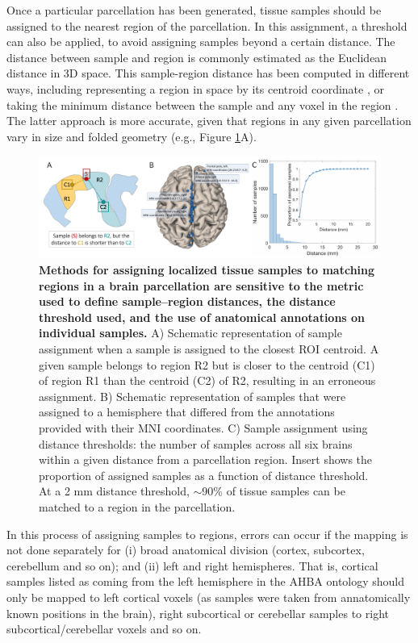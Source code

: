\documentclass[10pt,A4]{article}
\begin{document}
Once a particular parcellation has been generated, tissue samples should be assigned to the nearest region of the parcellation. In this assignment, a threshold can also be applied, to avoid assigning samples beyond a certain distance. The distance between sample and region is commonly estimated as the Euclidean distance in 3D space. This sample-region distance has been computed in different ways, including representing a region in space by its centroid coordinate \citep{Vertes2016b,Whitaker2016a,McColgan2018}, or taking the minimum distance between the sample and any voxel in the region \citep{French2015,Parkes2017,Romme2017}. The latter approach is more accurate, given that regions in any given parcellation vary in size and folded geometry (e.g., Figure \ref{fig:Ch4Fig5}A).

\begin{figure}[h!]
  \centering
    \includegraphics[width=1\textwidth]{Ch4Fig5.pdf}
\caption{\textbf{Methods for assigning localized tissue samples to matching regions in a brain parcellation are sensitive to the metric used to define sample–region distances, the distance threshold used, and the use of anatomical annotations on individual samples.}
A) Schematic representation of sample assignment when a sample is assigned to the closest ROI centroid. A given sample belongs to region R2 but is closer to the centroid (C1) of region R1 than the centroid (C2) of R2, resulting in an erroneous assignment.
B) Schematic representation of samples that were assigned to a hemisphere that differed from the annotations provided with their MNI coordinates.
C) Sample assignment using distance thresholds: the number of samples across all six brains within a given distance from a parcellation region. Insert shows the proportion of assigned samples as a function of distance threshold. At a \num{2} mm distance threshold, $\sim$\num{90}\%  of tissue samples can be matched to a region in the parcellation. }
\label{fig:Ch4Fig5}
\end{figure}

In this process of assigning samples to regions, errors can occur if the mapping is not done separately for (i) broad anatomical division (cortex, subcortex, cerebellum and so on); and (ii) left and right hemispheres. That is, cortical samples listed as coming from the left hemisphere in the AHBA ontology should only be mapped to left cortical voxels (as samples were taken from annatomically known positions in the brain), right subcortical or cerebellar samples to right subcortical/cerebellar voxels and so on.
\end{document}
